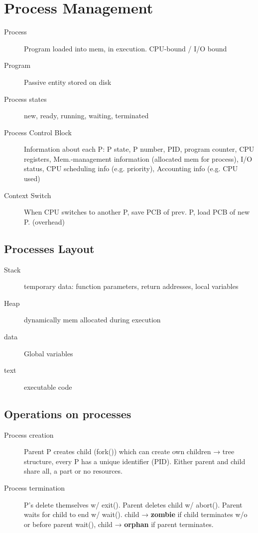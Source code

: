 \section*{Process Management}
\begin{description}
    \item[Process] Program loaded into mem, in execution. CPU-bound / I/O bound %
  \item[Program] Passive entity stored on disk
  \item[Process states] new, ready, running, waiting, terminated
  \item[Process Control Block] Information about each P: P state, P number, PID, program counter, CPU registers, Mem.-management information (allocated mem for process), I/O status, CPU scheduling info (e.g. priority), Accounting info (e.g. CPU used)
  \item[Context Switch] When CPU switches to another P, save PCB of prev. P, load PCB of new P. (overhead)
\end{description}

\subsection*{Processes Layout}
\begin{description}
  \item[Stack] temporary data: function parameters, return addresses, local variables
  \item[Heap] dynamically mem allocated during execution
  \item[data] Global variables
  \item[text] executable code
\end{description}

\subsection*{Operations on processes}
\begin{description}
  \item[Process creation]Parent P creates child (fork()) which can create own children → tree structure, every P has a unique identifier (PID). Either parent and child share all, a part or no resources.
  \item[Process termination] P's delete themselves w/ exit(). Parent deletes child w/ abort(). Parent waits for child to end w/ wait(). child → \textbf{zombie} if child terminates w/o or before parent wait(), child → \textbf{orphan} if parent terminates.
\end{description}

